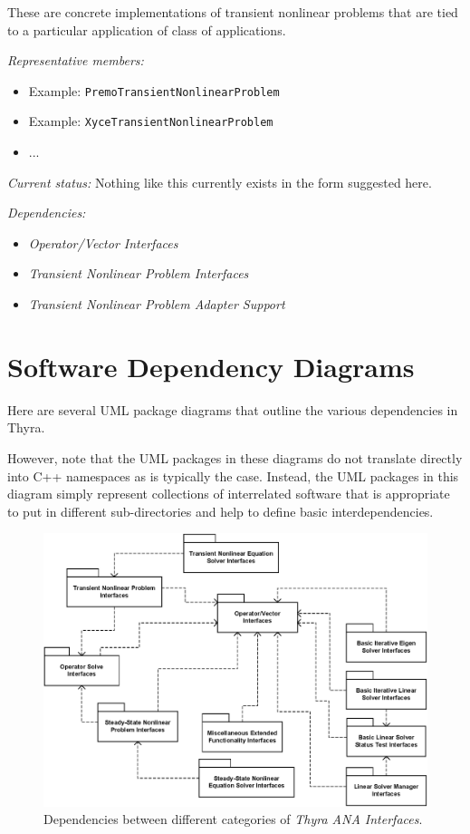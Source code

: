 \documentclass[pdf,ps2pdf,11pt]{SANDreport}
\begin{document}
These are concrete implementations of transient nonlinear problems that are
tied to a particular application of class of applications.

{}\textit{Representative members:}
\begin{itemize}
%
{}\item Example: {}\texttt{PremoTransientNonlinearProblem}
%
{}\item Example: {}\texttt{XyceTransientNonlinearProblem}
%
{}\item ...
%
\end{itemize}

{}\textit{Current status:} Nothing like this currently exists in the form
suggested here.

{}\textit{Dependencies:}
\begin{itemize}
\item {}\textit{Operator/Vector Interfaces}
\item {}\textit{Transient Nonlinear Problem Interfaces}
\item {}\textit{Transient Nonlinear Problem Adapter Support}
\end{itemize}

%
\section{Software Dependency Diagrams}
%

Here are several UML package diagrams that outline the various dependencies in
Thyra.

However, note that the UML packages in these diagrams do not translate
directly into C++ namespaces as is typically the case.  Instead, the UML
packages in this diagram simply represent collections of interrelated software
that is appropriate to put in different sub-directories and help to define
basic interdependencies.

{\bsinglespace
\begin{figure}[p]
\begin{center}
\includegraphics*[scale=0.70]{ThyraANAInterfaces}
\end{center}
\caption{
\label{thyra:fig:ThyraANAInterfaces}
Dependencies between different categories of {}\textit{Thyra ANA Interfaces}.
}
\end{figure}
\esinglespace}
\end{document}
